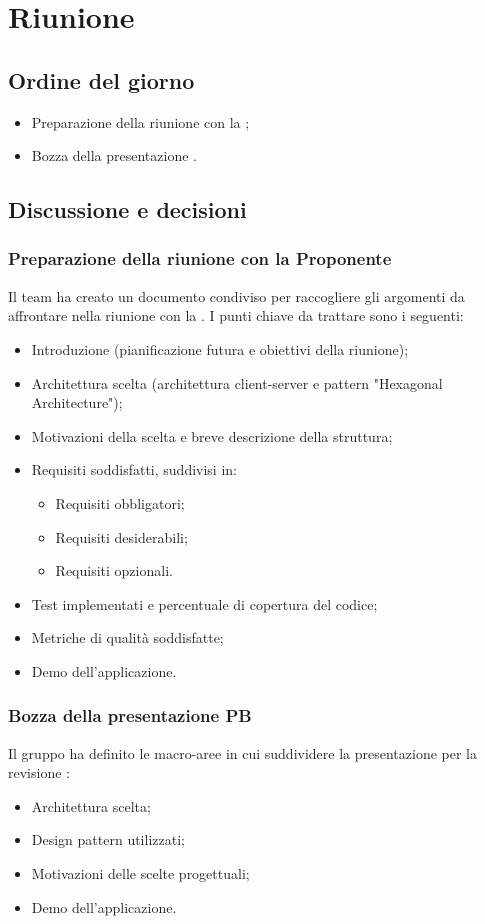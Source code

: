 \section{Riunione}
\subsection{Ordine del giorno}
\begin{itemize}
	\item Preparazione della riunione con la ;
	\item Bozza della presentazione .
\end{itemize}

\subsection{Discussione e decisioni}
\subsubsection{Preparazione della riunione con la Proponente}
\par Il team ha creato un documento condiviso per raccogliere gli argomenti da affrontare nella riunione con la . I punti chiave da trattare sono i seguenti:
\begin{itemize}
	\item Introduzione (pianificazione futura e obiettivi della riunione);
	\item Architettura scelta (architettura client-server e pattern "Hexagonal Architecture");
	\item Motivazioni della scelta e breve descrizione della struttura;
	\item Requisiti soddisfatti, suddivisi in:
	\begin{itemize}
		\item Requisiti obbligatori;
		\item Requisiti desiderabili;
		\item Requisiti opzionali.
	\end{itemize}
	\item Test implementati e percentuale di copertura del codice;
	\item Metriche di qualità soddisfatte;
	\item Demo dell'applicazione.
\end{itemize}

\subsubsection{Bozza della presentazione PB}
\par Il gruppo ha definito le macro-aree in cui suddividere la presentazione per la revisione :
\begin{itemize}
	\item Architettura scelta;
	\item Design pattern utilizzati;
	\item Motivazioni delle scelte progettuali;
	\item Demo dell'applicazione.
\end{itemize}
